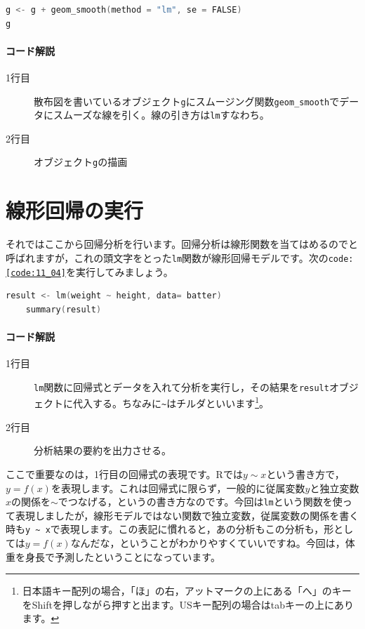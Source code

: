 \documentclass{ltjbook}
\begin{document}
\begin{lstlisting}[language=c++,label={code:11_03},caption={回帰線を引く}]
g <- g + geom_smooth(method = "lm", se = FALSE)
g
\end{lstlisting}
\paragraph{コード解説}
\begin{description}
	\item[1行目] 散布図を書いているオブジェクト\texttt{g}にスムージング関数\verb|geom_smooth|でデータにスムーズな線を引く。線の引き方は\texttt{lm}すなわち。
	\item[2行目] オブジェクト\texttt{g}の描画
\end{description}

\section{線形回帰の実行}
それではここから回帰分析を行います。回帰分析は線形関数を当てはめるのでと呼ばれますが，これの頭文字をとった\texttt{lm}関数が線形回帰モデルです。次の\texttt{code:\ref{code:11_04}}を実行してみましょう。
\begin{lstlisting}[language=c++,label={code:11_04},caption={回帰分析の実行}]
    result <- lm(weight ~ height, data= batter)
    summary(result)
\end{lstlisting}

\paragraph{コード解説}
\begin{description}
	\item[1行目] \texttt{lm}関数に回帰式とデータを入れて分析を実行し，その結果を\texttt{result}オブジェクトに代入する。ちなみに\verb|~|はチルダといいます\footnote{日本語キー配列の場合，「ほ」の右，アットマークの上にある「へ」のキーをShiftを押しながら押すと出ます。USキー配列の場合はtabキーの上にあります。}。
	\item[2行目] 分析結果の要約を出力させる。
\end{description}

ここで重要なのは，1行目の回帰式の表現です。Rでは$y\sim x $という書き方で，$y=f(x)$を表現します。これは回帰式に限らず，一般的に従属変数$y$と独立変数$x$の関係を$\sim$でつなげる，というの書き方なのです。今回は\texttt{lm}という関数を使って表現しましたが，線形モデルではない関数で独立変数，従属変数の関係を書く時も\verb|y ~ x|で表現します。この表記に慣れると，あの分析もこの分析も，形としては$y=f(x)$なんだな，ということがわかりやすくていいですね。今回は，体重を身長で予測したということになっています。
\end{document}
